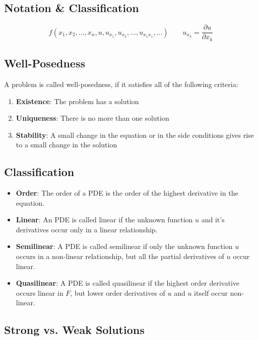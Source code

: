 \documentclass{article}
\begin{document}
\begin{twocolumn} 

\section{Notation \& Classification}

$$f(x_1, x_2, \ldots, x_n, u, u_{x_1}, u_{x_2}, \ldots, u_{x_1x_1}, \ldots) \qquad u_{x_k} = \frac{\partial u}{\partial x_k}$$

\subsection{Well-Posedness}

A problem is called well-posedness, if it satisfies all of the following criteria:
\begin{enumerate}
	\item \textbf{Existence}: The problem has a solution
	\item \textbf{Uniqueness}: There is no more than one solution
	\item \textbf{Stability}: A small change in the equation or in the side conditions gives rise to a small change in the solution
\end{enumerate}

\subsection{Classification}

\begin{itemize}
	\item \textbf{Order}: The order of a PDE is the order of the highest derivative in the equation.
	\item \textbf{Linear}: An PDE is called linear if the unknown function $u$ and it's derivatives occur only in a linear relationship. 
	\item \textbf{Semilinear}: A PDE is called semilinear if only the unknown function $u$ occurs in a non-linear relationship, but all the partial derivatives of $u$ occur linear.
	\item \textbf{Quasilinear}: A PDE is called quasilinear if the highest order derivative occurs linear in $F$, but lower order derivatives of $u$ and $u$ itself occur non-linear.
\end{itemize}

\subsection{Strong vs. Weak Solutions}


\end{twocolumn}
\end{document}
